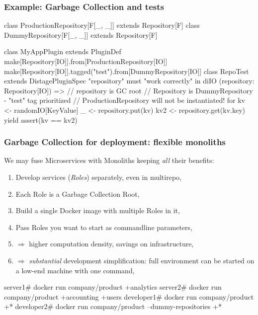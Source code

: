 \documentclass[usenames,dvipsnames]{beamer}
\begin{document}
\begin{frame}[fragile]
\frametitle{Example: Garbage Collection and tests}\begin{scalacode}
class ProductionRepository[F[_, _]] extends Repository[F]
class DummyRepository[F[_, _]] extends Repository[F]

class MyAppPlugin extends PluginDef {
  make[Repository[IO]].from[ProductionRepository[IO]]
  make[Repository[IO]].tagged("test").from[DummyRepository[IO]]
}
class RepoTest extends DistagePluginSpec { 
  "repository" must {
    "work correctly" in diIO {
      (repository: Repository[IO]) => // repository is GC root
      // Repository is DummyRepository - "test" tag prioritized
      // ProductionRepository will not be instantiated!
      for { kv  <- randomIO[KeyValue]
            _   <- repository.put(kv)
            kv2 <- repository.get(kv.key)
      } yield assert(kv == kv2)
}}}
  \end{scalacode}
\end{frame}

\begin{frame}[fragile]
\frametitle{Garbage Collection for deployment: flexible monoliths}
  We may fuse Microservices with Monoliths keeping \textit{all} their benefits:
  \begin{enumerate}
  \item Develop services (\textit{Roles}\footnotemark[1]) separately, even in multirepo,
  \item Each Role is a Garbage Collection Root,
  \item Build a single Docker image with multiple Roles in it,
  \item Pass Roles you want to start as commandline parameters,
  \item $\Rightarrow$ higher computation density, savings on infrastructure,
  \item $\Rightarrow$ \textit{substantial} development simplification: full environment can be started on a low-end machine with one command,
  \end{enumerate}

  \begin{textcode}
server1# docker run company/product +analytics
server2# docker run company/product +accounting +users
developer1# docker run company/product +*
developer2# docker run company/product --dummy-repositories +*
  \end{textcode}

\end{frame}
\end{document}
